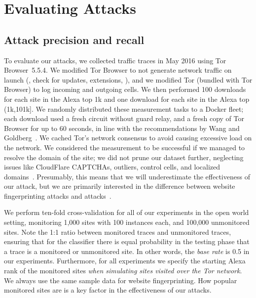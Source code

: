\section{Evaluating \name Attacks}
\label{sec:analysis}

\subsection{Attack precision and recall}

To evaluate our \name attacks, we collected traffic traces in May
2016 using Tor Browser~5.5.4.
We modified Tor Browser to not generate network traffic on launch
(\ie, check for
updates, extensions, \etc), and we modified
Tor (bundled with Tor Browser) to log incoming and outgoing cells.
We then performed 100 downloads for each site in the Alexa top
1k and one download for each site in the
Alexa top (1k,101k]. We randomly distributed these measurement tasks
to a Docker fleet; each download used a fresh circuit without
guard relay, and a fresh copy of Tor Browser for up to 60 seconds,
in line with the recommendations by Wang and Goldberg~\cite[\S~4]{Wang2013a}.
We cached Tor's network consensus to avoid causing excessive load on the
network.  We considered the measurement to be successful if we managed to
resolve the domain of the site; we did not prune our dataset further, neglecting
issues like CloudFlare CAPTCHAs, outliers, control cells, and localized
domains~\cite{Juarez2014a}.  Presumably, this means that we will underestimate
the effectiveness of our attack, but we are primarily interested in the
difference between website fingerprinting attacks and \name
attacks~\cite{Wang2013a}.

We perform ten-fold cross-validation for all of our experiments in the open
world setting, monitoring 1,000 sites with 100 instances each, and
100,000 unmonitored sites.
Note the 1:1 ratio between monitored traces and unmonitored traces,
ensuring that for the classifier there is equal probability in the testing
phase that a trace is a monitored or unmonitored site.
In other words, the \emph{base rate} is 0.5 in our experiments.
Furthermore, for all experiments we specify the starting Alexa rank of the
monitored sites
\emph{when simulating sites visited over the Tor network}.
We always use the same sample data for website fingerprinting.
How popular monitored sites
are is a key factor in the effectiveness of our attacks.


